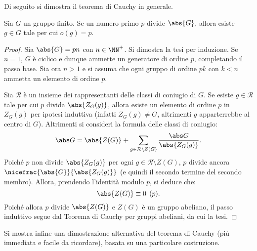 \documentclass[12pt]{scrartcl}
\begin{document}
	Di seguito si dimostra il teorema di Cauchy in generale.
	
	\begin{theorem}[di Cauchy]
		Sia $G$ un gruppo finito. Se un numero primo $p$ divide $\abs{G}$, allora
		esiste $g \in G$ tale per cui $o(g) = p$.
	\end{theorem}
	
	\begin{proof}
		Sia $\abs{G} = pn$ con $n \in \NN^+$. Si dimostra la tesi per induzione.
		Se $n = 1$, $G$ è ciclico e dunque ammette un generatore di ordine $p$,
		completando il passo base. Sia ora $n > 1$ e si assuma che ogni gruppo di ordine $pk$ con
		$k < n$ ammetta un elemento di ordine $p$. \medskip
		
		
		Sia $\mathcal{R}$ è un insieme dei rappresentanti delle classi di coniugio
		di $G$. Se esiste $g \in \mathcal{R}$ tale per cui $p$ divida
		$\abs{Z_G(g)}$, allora esiste un elemento di ordine $p$ in
		$Z_G(g)$ per ipotesi induttiva (infatti $Z_G(g) \neq G$, altrimenti
		$g$ apparterrebbe al centro di $G$). Altrimenti si consideri la formula delle classi
		di coniugio:
		\[
			\abs G = \abs{Z(G)} + \sum_{g \in \mathcal{R} \setminus Z(G)} \frac{\abs G}{\abs{Z_G(g)}}.
		\]
		Poiché $p$ non divide $\abs{Z_G(g)}$ per ogni $g \in \mathcal{R} \setminus Z(G)$,
		$p$ divide ancora $\nicefrac{\abs{G}}{\abs{Z_G(g)}}$ (e quindi il secondo termine
		del secondo membro). Allora, prendendo
		l'identità modulo $p$, si deduce che:
		\[ \abs{Z(G)} \equiv 0 \pod p. \]		
		Poiché allora $p$ divide $\abs{Z(G)}$ e $Z(G)$ è un gruppo abeliano,
		il passo induttivo segue dal Teorema di Cauchy per gruppi abeliani,
		da cui la tesi.
	\end{proof} \smallskip
	
	
	Si mostra infine una dimostrazione alternativa del teorema di Cauchy (più immediata
	e facile da ricordare), basata su una particolare costruzione.
	
\end{document}
